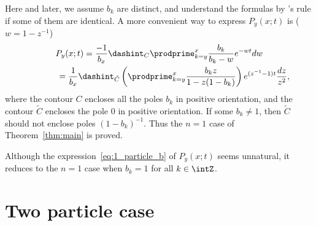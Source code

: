 Here and later, we assume $b_k$ are distinct, and understand the formulas by \lHopital's rule if some of them are identical. A more convenient way to express $P_y(x; t)$ is ($w = 1 - z^{-1}$)
\begin{subequations}
 \begin{gather}
 P_y(x; t) =   \frac{-1}{b_x} \dashint_C \prodprime^x_{k = y} \frac{b_k}{b_k - w} e^{-wt} dw \label{eq:1_particle_a} \\
\hphantom{P_y(x; t)}{}  =   \frac{1}{b_x} \dashint_{\tilde{C}} \left( \prodprime^x_{k = y} \frac{b_k z}{1 - z(1 - b_k)} \right) e^{(z^{-1} - 1)t} \frac{dz}{z^2}, \label{eq:1_particle_b}
 \end{gather}
\end{subequations}
where the contour $C$ encloses all the poles $b_k$ in positive orientation, and the contour $\tilde{C}$ encloses the pole $0$ in positive orientation. If some $b_k \neq 1$, then $\tilde{C}$ should not enclose poles $(1 - b_k)^{-1}$. Thus the $n = 1$ case of Theorem~\ref{thm:main} is proved.

\begin{Remark}
 Although the expression~\eqref{eq:1_particle_b} of $P_y(x; t)$ seems unnatural, it reduces to the $n = 1$ case \cite[Theorem~2.1]{Korhonen-Lee14} when $b_k = 1$ for all $k \in \intZ$.
\end{Remark}

\section{Two particle case} \label{sec:2_particle_case}

